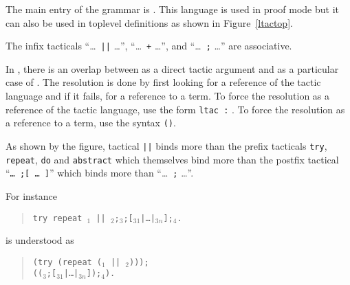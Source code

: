 The main entry of the grammar is {\tacexpr}. This language is used in
proof mode but it can also be used in toplevel definitions as shown in
Figure~\ref{ltactop}.

\begin{Remarks}
\item The infix tacticals ``\dots\ {\tt ||} \dots'', ``\dots\ {\tt +}
  \dots'', and ``\dots\ {\tt ;} \dots'' are associative.

\item In {\tacarg}, there is an overlap between {\qualid} as a
direct tactic argument and {\qualid} as a particular case of
{\term}. The resolution is done by first looking for a reference of
the tactic language and if it fails, for a reference to a term. To
force the resolution as a reference of the tactic language, use the
form {\tt ltac :} {\qualid}. To force the resolution as a reference to
a term, use the syntax {\tt ({\qualid})}.

\item As shown by the figure, tactical {\tt ||} binds more than the
prefix tacticals {\tt try}, {\tt repeat}, {\tt do} and
{\tt abstract} which themselves bind more than the postfix tactical
``{\tt \dots\ ;[ \dots\ ]}'' which binds more than ``\dots\ {\tt ;}
\dots''.

For instance
\begin{quote}
{\tt try repeat \tac$_1$ ||
  \tac$_2$;\tac$_3$;[\tac$_{31}$|\dots|\tac$_{3n}$];\tac$_4$.}
\end{quote}
is understood as
\begin{quote}
{\tt (try (repeat (\tac$_1$ || \tac$_2$)));} \\
{\tt ((\tac$_3$;[\tac$_{31}$|\dots|\tac$_{3n}$]);\tac$_4$).}
\end{quote}
\end{Remarks}


